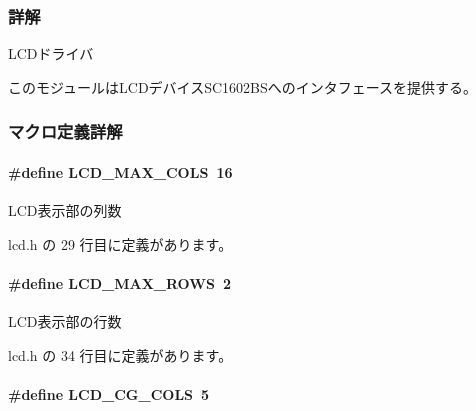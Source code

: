 \subsubsection{詳解}
L\+C\+Dドライバ 

このモジュールは\+L\+C\+Dデバイス\+S\+C1602\+B\+Sへのインタフェースを提供する。

 

\subsubsection{マクロ定義詳解}
\paragraph[{L\+C\+D\+\_\+\+M\+A\+X\+\_\+\+C\+O\+L\+S}]{\setlength{\rightskip}{0pt plus 5cm}\#define L\+C\+D\+\_\+\+M\+A\+X\+\_\+\+C\+O\+L\+S~16}\label{lcd_8h_adae78cd0d04b19760d362972fe9b89ec_adae78cd0d04b19760d362972fe9b89ec}


L\+C\+D表示部の列数 



 lcd.\+h の 29 行目に定義があります。

\paragraph[{L\+C\+D\+\_\+\+M\+A\+X\+\_\+\+R\+O\+W\+S}]{\setlength{\rightskip}{0pt plus 5cm}\#define L\+C\+D\+\_\+\+M\+A\+X\+\_\+\+R\+O\+W\+S~2}\label{lcd_8h_a77ea70242c5ca6ad568f9857d2f19f5d_a77ea70242c5ca6ad568f9857d2f19f5d}


L\+C\+D表示部の行数 



 lcd.\+h の 34 行目に定義があります。

\paragraph[{L\+C\+D\+\_\+\+C\+G\+\_\+\+C\+O\+L\+S}]{\setlength{\rightskip}{0pt plus 5cm}\#define L\+C\+D\+\_\+\+C\+G\+\_\+\+C\+O\+L\+S~5}\label{lcd_8h_a5c9aa8fefb9889cd206088bffd11a775_a5c9aa8fefb9889cd206088bffd11a775}


